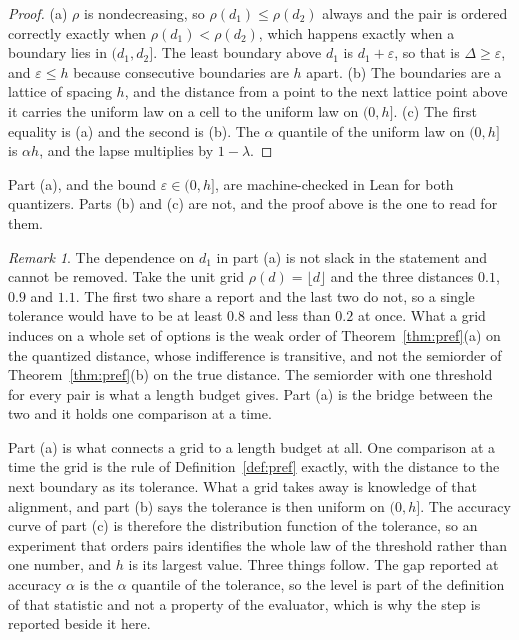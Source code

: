 \documentclass{article}
\theoremstyle{definition}
\theoremstyle{remark}
\newtheorem*{remark}{Remark}
\begin{document}
\begin{proof}
(a) $\rho$ is nondecreasing, so $\rho(d_{1})\le\rho(d_{2})$ always and the pair is ordered correctly exactly when $\rho(d_{1})<\rho(d_{2})$, which happens exactly when a boundary lies in $(d_{1},d_{2}]$.
The least boundary above $d_{1}$ is $d_{1}+\varepsilon$, so that is $\Delta\ge\varepsilon$, and $\varepsilon\le h$ because consecutive boundaries are $h$ apart.
(b) The boundaries are a lattice of spacing $h$, and the distance from a point to the next lattice point above it carries the uniform law on a cell to the uniform law on $(0,h]$.
(c) The first equality is (a) and the second is (b). The $\alpha$ quantile of the uniform law on $(0,h]$ is $\alpha h$, and the lapse multiplies by $1-\lambda$.
\end{proof}

Part (a), and the bound $\varepsilon\in(0,h]$, are machine-checked in Lean for both quantizers. Parts (b) and (c) are not, and the proof above is the one to read for them.
\begin{remark}
The dependence on $d_{1}$ in part (a) is not slack in the statement and cannot be removed. Take the unit grid $\rho(d)=\lfloor d\rfloor$ and the three distances $0.1$, $0.9$ and $1.1$. The first two share a report and the last two do not, so a single tolerance would have to be at least $0.8$ and less than $0.2$ at once. What a grid induces on a whole set of options is the weak order of Theorem~\ref{thm:pref}(a) on the quantized distance, whose indifference is transitive, and not the semiorder of Theorem~\ref{thm:pref}(b) on the true distance. The semiorder with one threshold for every pair is what a length budget gives. Part (a) is the bridge between the two and it holds one comparison at a time.
\end{remark}
Part (a) is what connects a grid to a length budget at all.
One comparison at a time the grid is the rule of Definition~\ref{def:pref} exactly, with the distance to the next boundary as its tolerance. What a grid takes away is knowledge of that alignment, and part (b) says the tolerance is then uniform on $(0,h]$.
The accuracy curve of part (c) is therefore the distribution function of the tolerance, so an experiment that orders pairs identifies the whole law of the threshold rather than one number, and $h$ is its largest value.
Three things follow.
The gap reported at accuracy $\alpha$ is the $\alpha$ quantile of the tolerance, so the level is part of the definition of that statistic and not a property of the evaluator, which is why the step is reported beside it here.
\end{document}
